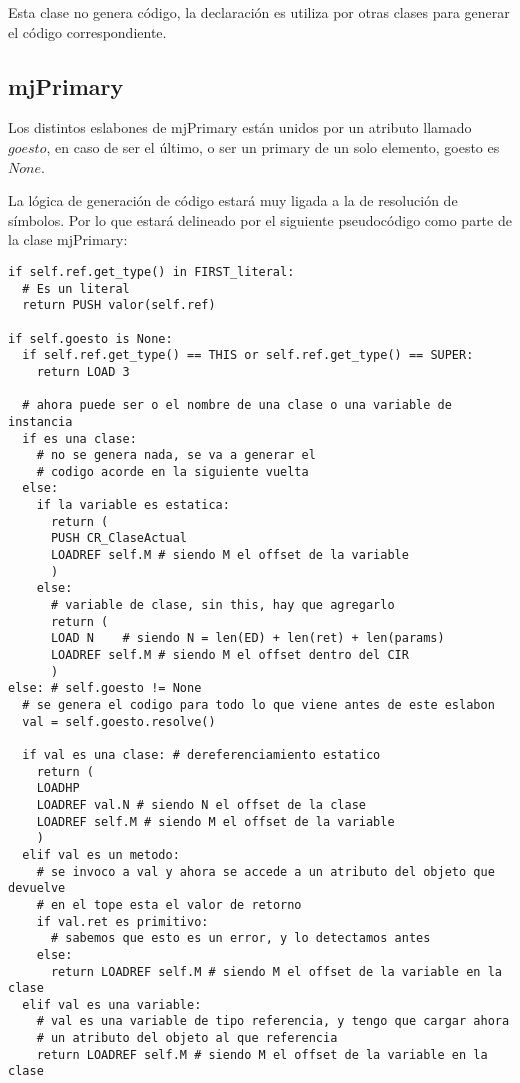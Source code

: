 \documentclass [a4paper,abstracton,titlepage]{scrartcl}
\begin{document}
Esta clase no genera código, la declaración es utiliza por otras clases para generar el código correspondiente.

  \subsection{mjPrimary}

Los distintos eslabones de mjPrimary están unidos por un atributo llamado
$goesto$, en caso de ser el último, o ser un primary de un solo elemento,
goesto es $None$.

La lógica de generación de código estará muy ligada a la de resolución de
símbolos. Por lo que estará delineado por el siguiente pseudocódigo como parte
de la clase mjPrimary:

\begin{lstlisting}
if self.ref.get_type() in FIRST_literal:
  # Es un literal
  return PUSH valor(self.ref)

if self.goesto is None:
  if self.ref.get_type() == THIS or self.ref.get_type() == SUPER:
    return LOAD 3
  
  # ahora puede ser o el nombre de una clase o una variable de instancia
  if es una clase:
    # no se genera nada, se va a generar el 
    # codigo acorde en la siguiente vuelta
  else:
    if la variable es estatica:
      return (
      PUSH CR_ClaseActual
      LOADREF self.M # siendo M el offset de la variable
      )
    else:
      # variable de clase, sin this, hay que agregarlo
      return (
      LOAD N    # siendo N = len(ED) + len(ret) + len(params)
      LOADREF self.M # siendo M el offset dentro del CIR
      )
else: # self.goesto != None
  # se genera el codigo para todo lo que viene antes de este eslabon
  val = self.goesto.resolve() 

  if val es una clase: # dereferenciamiento estatico
    return (
    LOADHP
    LOADREF val.N # siendo N el offset de la clase
    LOADREF self.M # siendo M el offset de la variable
    )
  elif val es un metodo: 
    # se invoco a val y ahora se accede a un atributo del objeto que devuelve
    # en el tope esta el valor de retorno
    if val.ret es primitivo:
      # sabemos que esto es un error, y lo detectamos antes
    else:
      return LOADREF self.M # siendo M el offset de la variable en la clase
  elif val es una variable:
    # val es una variable de tipo referencia, y tengo que cargar ahora
    # un atributo del objeto al que referencia
    return LOADREF self.M # siendo M el offset de la variable en la clase
\end{lstlisting}
\end{document}
